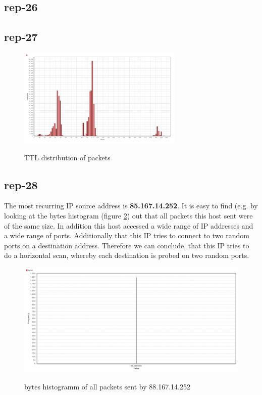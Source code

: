 \subsection*{rep-26}

\subsection*{rep-27}

\begin{figure}[H]
\center
\includegraphics[width=0.7\textwidth]{./chapters/plots/rep-27-ttl}\\
\caption{TTL distribution of packets}
\label{fig:ttl-distribution}
\end{figure}

\subsection*{rep-28}
The most recurring IP source address is \textbf{85.167.14.252}.
It is easy to find (e.g. by looking at the bytes histogram (figure \ref{fig:bytes-histo}) out that all packets this host sent were of the same size. In addition this host accessed a wide range of IP addresses and a wide range of ports. Additionally that this IP tries to connect to two random ports on a destination address. Therefore we can conclude, that this IP tries to do a horizontal scan, whereby each destination is probed on two random ports.

\begin{figure}[H]
\center
\includegraphics[width=.7\textwidth]{./chapters/plots/rep-28-bytes-histo}\\
\caption{bytes histogramm of all packets sent by 88.167.14.252}
\label{fig:bytes-histo}
\end{figure}

